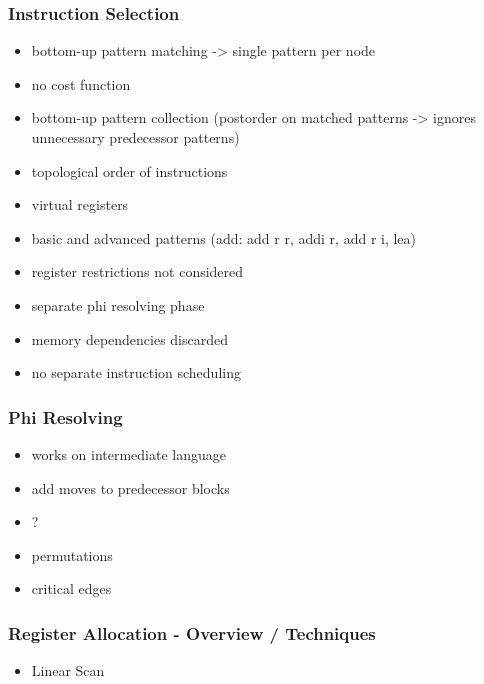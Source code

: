 \documentclass[navbaroff,en]{sdqbeamer}
\begin{document}
\begin{frame}
    \frametitle{Instruction Selection}

    \begin{itemize}
        \item bottom-up pattern matching -> single pattern per node
        \item no cost function
        \item bottom-up pattern collection (postorder on matched patterns -> ignores unnecessary predecessor patterns)
        \item topological order of instructions
        \item virtual registers
        \item basic and advanced patterns (add: add r r, addi r, add r i, lea)
        \item register restrictions not considered
        \item separate phi resolving phase
        \item memory dependencies discarded
        \vspace{1em}
        \item no separate instruction scheduling
    \end{itemize}

\end{frame}

\begin{frame}
    \frametitle{Phi Resolving}

    \begin{itemize}
        \item works on intermediate language
        \item add moves to predecessor blocks
        \item ?
        \item permutations
        \item critical edges
    \end{itemize}

\end{frame}

\begin{frame}
    \frametitle{Register Allocation - Overview / Techniques}

    \begin{itemize}
        \item Linear Scan
    \end{itemize}

\end{frame}
\end{document}
